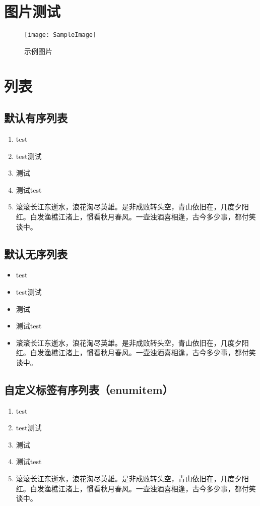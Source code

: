 \documentclass{../../PublicResources/DocClass}
\begin{document}
    \section{图片测试}
    \begin{figure}[h]
        \centering
        \texttt{[image: SampleImage]}
        \caption{示例图片}
    \end{figure}

    \section{列表}
    \subsection{默认有序列表}
    \begin{enumerate}
        \item test
        \item test测试
        \item 测试
        \item 测试test
        \item 滚滚长江东逝水，浪花淘尽英雄。是非成败转头空，青山依旧在，几度夕阳红。白发渔樵江渚上，惯看秋月春风。一壶浊酒喜相逢，古今多少事，都付笑谈中。
    \end{enumerate}

    \subsection{默认无序列表}
    \begin{itemize}
        \item test
        \item test测试
        \item 测试
        \item 测试test
        \item 滚滚长江东逝水，浪花淘尽英雄。是非成败转头空，青山依旧在，几度夕阳红。白发渔樵江渚上，惯看秋月春风。一壶浊酒喜相逢，古今多少事，都付笑谈中。
    \end{itemize}

    \subsection{自定义标签有序列表（enumitem）}
    \begin{enumerate}[label={Step \arabic*.}]
        \item test
        \item test测试
        \item 测试
        \item 测试test
        \item 滚滚长江东逝水，浪花淘尽英雄。是非成败转头空，青山依旧在，几度夕阳红。白发渔樵江渚上，惯看秋月春风。一壶浊酒喜相逢，古今多少事，都付笑谈中。
    \end{enumerate}
\end{document}
